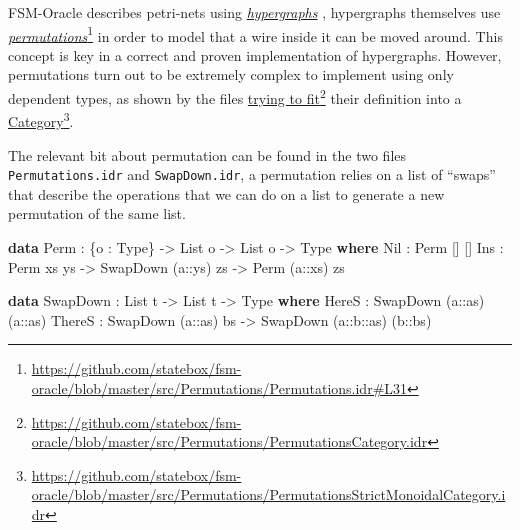 \documentclass[
]{article}
\newenvironment{Shaded}{}{}
\newcommand{\DataTypeTok}[1]{\textcolor[rgb]{0.56,0.13,0.00}{#1}}
\newcommand{\KeywordTok}[1]{\textcolor[rgb]{0.00,0.44,0.13}{\textbf{#1}}}
\newcommand{\NormalTok}[1]{#1}
\newcommand{\OperatorTok}[1]{\textcolor[rgb]{0.40,0.40,0.40}{#1}}
\newcommand{\OtherTok}[1]{\textcolor[rgb]{0.00,0.44,0.13}{#1}}
\begin{document}
FSM-Oracle describes petri-nets using
\href{http://www.zanasi.com/fabio/files/paperCALCO19b.pdf}{\emph{hypergraphs}}
\cite{cartographer} , hypergraphs themselves use
\href{https://github.com/statebox/fsm-oracle/blob/master/src/Permutations/Permutations.idr\#L31}{\emph{permutations}}\footnote{\url{https://github.com/statebox/fsm-oracle/blob/master/src/Permutations/Permutations.idr\#L31}}
in order to model that a wire inside it can be moved around. This
concept is key in a correct and proven implementation of hypergraphs.
However, permutations turn out to be extremely complex to implement
using only dependent types, as shown by the files
\href{https://github.com/statebox/fsm-oracle/blob/master/src/Permutations/PermutationsCategory.idr}{trying
to fit}\footnote{\url{https://github.com/statebox/fsm-oracle/blob/master/src/Permutations/PermutationsCategory.idr}}
their definition into a
\href{https://github.com/statebox/fsm-oracle/blob/master/src/Permutations/PermutationsStrictMonoidalCategory.idr}{Category}\footnote{\url{https://github.com/statebox/fsm-oracle/blob/master/src/Permutations/PermutationsStrictMonoidalCategory.idr}}.

The relevant bit about permutation can be found in the two files
\texttt{Permutations.idr} and \texttt{SwapDown.idr}, a permutation
relies on a list of ``swaps'' that describe the operations that we can
do on a list to generate a new permutation of the same list.

\begin{Shaded}
\begin{Highlighting}[]
\KeywordTok{data} \DataTypeTok{Perm} \OperatorTok{:}\NormalTok{ \{o }\OperatorTok{:} \DataTypeTok{Type}\NormalTok{\} }\OtherTok{{-}\textgreater{}} \DataTypeTok{List}\NormalTok{ o }\OtherTok{{-}\textgreater{}} \DataTypeTok{List}\NormalTok{ o }\OtherTok{{-}\textgreater{}} \DataTypeTok{Type} \KeywordTok{where}
  \DataTypeTok{Nil} \OperatorTok{:} \DataTypeTok{Perm}\NormalTok{ [] []}
  \DataTypeTok{Ins} \OperatorTok{:} \DataTypeTok{Perm}\NormalTok{ xs ys }\OtherTok{{-}\textgreater{}} \DataTypeTok{SwapDown}\NormalTok{ (}\OtherTok{a::}\NormalTok{ys) zs }\OtherTok{{-}\textgreater{}} \DataTypeTok{Perm}\NormalTok{ (}\OtherTok{a::}\NormalTok{xs) zs}

\KeywordTok{data} \DataTypeTok{SwapDown} \OperatorTok{:} \DataTypeTok{List}\NormalTok{ t }\OtherTok{{-}\textgreater{}} \DataTypeTok{List}\NormalTok{ t }\OtherTok{{-}\textgreater{}} \DataTypeTok{Type} \KeywordTok{where}
  \DataTypeTok{HereS}  \OperatorTok{:} \DataTypeTok{SwapDown}\NormalTok{ (}\OtherTok{a::}\NormalTok{as) (}\OtherTok{a::}\NormalTok{as)}
  \DataTypeTok{ThereS} \OperatorTok{:} \DataTypeTok{SwapDown}\NormalTok{ (}\OtherTok{a::}\NormalTok{as) bs }\OtherTok{{-}\textgreater{}} \DataTypeTok{SwapDown}\NormalTok{ (}\OtherTok{a::b::}\NormalTok{as) (}\OtherTok{b::}\NormalTok{bs)}
\end{Highlighting}
\end{Shaded}
\end{document}
